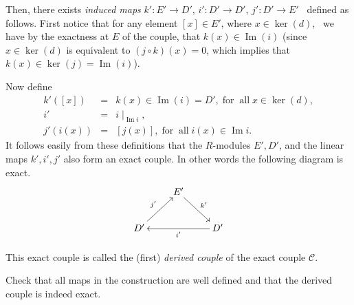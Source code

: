 \documentclass[../main.tex]{subfiles}
\begin{document}
Then, there exists {{\em induced maps\/}} $k' : E'
\longrightarrow D'$, $i' : D' \longrightarrow D'$, $j' : D' \longrightarrow
E'$ \ defined as follows. 
First notice that for any element $[x] \in E'$, where $x \in \ker (d)$, \
we have by the exactness at $E$ of the couple, that $k
(x) \in \ensuremath{\operatorname{Im}} (i)$ (since $x \in \ker (d)$ is
equivalent to 
$(j \circ k) (x) = 0$,
 which implies that $k (x) \in
\ker (j) =\ensuremath{\operatorname{Im}} (i)$).

Now define
\begin{eqnarray}
\nonumber
  k' ([x]) & = & k (x) \in \ensuremath{\operatorname{Im}}
  (i) = D', \ensuremath{\operatorname{for}}\ensuremath{\operatorname{all}}x
  \in \ker (d), \\
  \label{eqn:defnofderivedcouple}
  i' & = & i \mid_{\ensuremath{\operatorname{Im}}i}, \\
  \nonumber
  j' (i (x)) & = & [j (x)],
  \ensuremath{\operatorname{for}}\ensuremath{\operatorname{all}}i (x) \in
  \ensuremath{\operatorname{Im}}i. 
\end{eqnarray}
It follows easily from these definitions that the $R$-modules $E', D'$,
and the linear maps $k', i', j'$ also form an exact couple. In other
words the following diagram is exact.
\[
\xymatrix{
&E' \ar[rd]^{k'}& \\
D'\ar[ur]^{j'}&& D'\ar[ll]^{i'} 
}
\]

\begin{defn}
  \label{def:derived} This exact couple
  is called the (first) \emph{derived couple} of the
  exact couple $\mathcal{C}$.
\end{defn}

\begin{ex}
Check that all maps in the construction are well defined and that the derived couple is indeed exact.
\end{ex}
\end{document}
